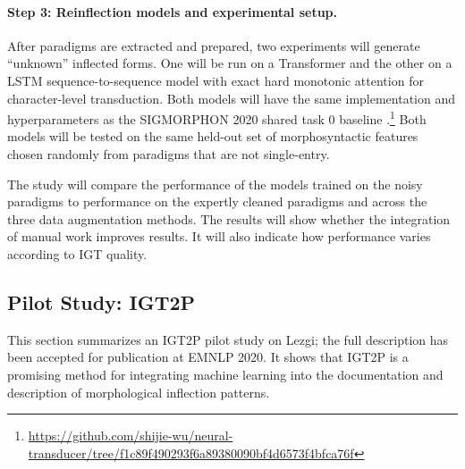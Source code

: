 \paragraph{Step 3: Reinflection models and experimental setup.}
After paradigms are extracted and prepared, two experiments will generate ``unknown'' inflected forms. One will be run on a Transformer and the other on a LSTM sequence-to-sequence model with exact hard monotonic attention for character-level transduction. Both models will have the same implementation and hyperparameters as the SIGMORPHON 2020 shared task 0 baseline \citep{vylomova2020sigmorphon}.\footnote{\url{https://github.com/shijie-wu/neural-transducer/tree/f1c89f490293f6a89380090bf4d6573f4bfca76f}} Both models will be tested on the same held-out set of morphosyntactic features chosen randomly from paradigms that are not single-entry. 

The study will compare the performance of the models trained on the noisy paradigms to performance on the expertly cleaned paradigms and across the three data augmentation methods. The results will show whether the integration of manual work improves results. It will also indicate how performance varies according to IGT quality.  

\subsection{Pilot Study: IGT2P}
\label{sec:pilotIGT2P}

This section summarizes an IGT2P pilot study on Lezgi; the full description has been accepted for publication at EMNLP 2020. It shows that IGT2P is a promising method for integrating machine learning into the documentation and description of morphological inflection patterns.

